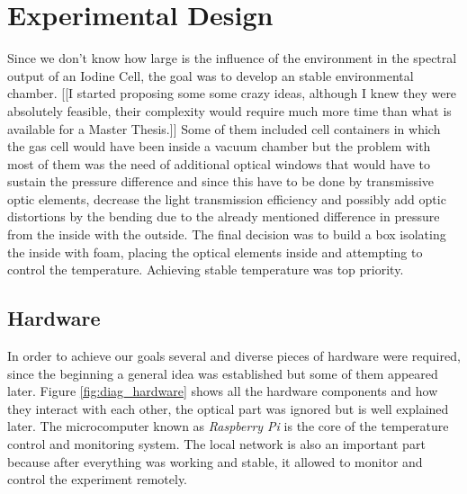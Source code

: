 \documentclass[master,       %
               twoside,        %
               BCOR10mm,       %
               ngerman,english  %
               ]{GAUBM_astro}
\begin{document}
\chapter{Experimental Design}
Since we don't know how large is the influence of the environment in the spectral output of an Iodine Cell, the goal was to develop an stable 
environmental chamber. [[I started proposing some some crazy ideas, although I knew they were absolutely feasible, their complexity would require
much more time than what is available for a Master Thesis.]] Some of them included cell containers in which the gas cell would have been inside a 
vacuum chamber but the problem with most of them was the need of additional optical windows that would have to sustain the pressure difference
and since this have to be done by transmissive optic elements, decrease the light transmission efficiency and possibly add optic distortions by the bending due to the already mentioned difference in pressure
from the inside with the outside. The final decision was to build a box isolating the inside with foam, placing the optical elements inside and 
attempting to control the temperature. Achieving stable temperature was top priority.
\section{Hardware}
In order to achieve our goals several and diverse pieces of hardware were required, since the beginning a general idea was established but 
some of them appeared later. Figure \ref{fig:diag_hardware} shows all the hardware components and how they interact with each other,
the optical part was ignored but is well explained later. The microcomputer known as \emph{Raspberry Pi} is the core of the temperature 
control and monitoring system. The local network is also an important part because after everything was working and stable, it allowed
to monitor and control the experiment remotely.
\end{document}
